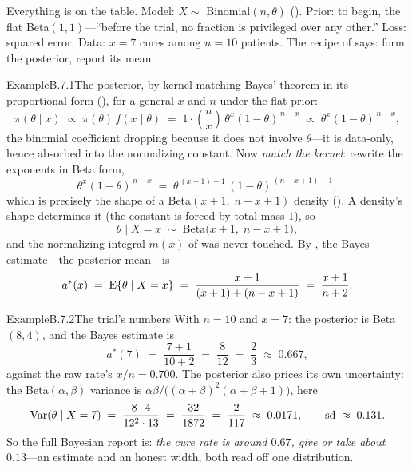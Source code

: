 \documentclass[main.tex]{subfiles}
\begin{document}

Everything is on the table. Model: $X\sim$ Binomial$(n,\theta)$ (). Prior: to
begin, the flat Beta$(1,1)$---``before the trial, no fraction is privileged over any
other.'' Loss: squared error. Data: $x=7$ cures among $n=10$ patients. The recipe of
 says: form the posterior, report its mean.

\begin{ObjL}{Example}{B.7.1}{The posterior, by kernel-matching}
Bayes' theorem in its proportional form (), for a general $x$ and $n$ under the
flat prior:
\[ \pi(\theta \mid x) \;\propto\; \pi(\theta)\, f(x\mid\theta)
   \;=\; 1 \cdot \binom{n}{x}\,\theta^{x}(1-\theta)^{\,n-x}
   \;\propto\; \theta^{x}(1-\theta)^{\,n-x} , \]
the binomial coefficient dropping because it does not involve $\theta$---it is data-only,
hence absorbed into the normalizing constant. Now \emph{match the kernel}: rewrite the
exponents in Beta form,
\[ \theta^{x}(1-\theta)^{\,n-x} \;=\; \theta^{\,(x+1)-1}\,(1-\theta)^{\,(n-x+1)-1} , \]
which is precisely the shape of a Beta$(x+1,\; n-x+1)$ density (). A density's
shape determines it (the constant is forced by total mass $1$), so
\[ \theta \mid X = x \;\sim\; \text{Beta}\big(x+1,\; n-x+1\big) , \]
and the normalizing integral $m(x)$ of  was never touched. By , the
Bayes estimate---the posterior mean---is
\[ a^{*}(x) \;=\; \mathrm{E}\{\theta\mid X=x\} \;=\; \frac{x+1}{(x+1)+(n-x+1)}
   \;=\; \frac{x+1}{n+2} . \]
\end{ObjL}

\begin{ObjL}{Example}{B.7.2}{The trial's numbers}
With $n=10$ and $x=7$: the posterior is Beta$(8,4)$, and the Bayes estimate is
\[ a^{*}(7) \;=\; \frac{7+1}{10+2} \;=\; \frac{8}{12} \;=\; \frac{2}{3} \;\approx\; 0.667 , \]
against the raw rate's $x/n=0.700$. The posterior also prices its own uncertainty: the
Beta$(\alpha,\beta)$ variance is
$\alpha\beta/\big((\alpha+\beta)^2(\alpha+\beta+1)\big)$, here
\[ \operatorname{Var}(\theta\mid X=7) \;=\; \frac{8\cdot4}{12^2\cdot13} \;=\; \frac{32}{1872}
   \;=\; \frac{2}{117} \;\approx\; 0.0171 ,
   \qquad \text{sd} \;\approx\; 0.131 . \]
So the full Bayesian report is: \emph{the cure rate is around $0.67$, give or take about
$0.13$}---an estimate and an honest width, both read off one distribution.
\end{ObjL}
\end{document}
